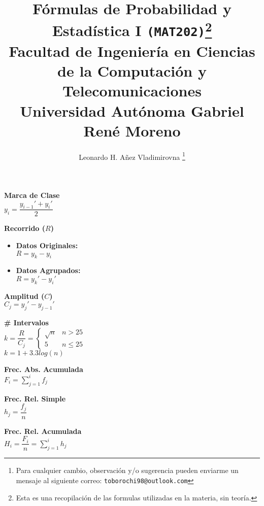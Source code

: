 \documentclass[10pt,letterpaper]{article}
\author{Leonardo H. Añez Vladimirovna \footnote{Para cualquier cambio, observación y/o sugerencia pueden enviarme un mensaje al siguiente correo: \texttt{toborochi98@outlook.com}}}
\title{Fórmulas de Probabilidad y Estadística I \texttt{(MAT202)}\footnote{Esta es una recopilación de las formulas utilizadas en la materia, sin teoría.}\\{\normalsize Facultad de Ingeniería en Ciencias de la Computación y Telecomunicaciones}\\ \vspace{-0.025cm}\normalsize Universidad Autónoma Gabriel René Moreno}
\begin{document}
\maketitle
\begin{multicols}{4}
\begin{flushleft}
\textbf{Marca de Clase}\\
\vspace{0.25cm}
\noindent $y_i=\dfrac{y_{i-1}'+y_i'}{2}$
\end{flushleft}
\columnbreak
\begin{flushleft}
\textbf{Recorrido ($R$)}\\
\begin{itemize}
\item \textbf{Datos Originales:}\\ $R=y_k -y_i$
\item \textbf{Datos Agrupados:}\\ $R=y_k' -y_i'$
\end{itemize}
\end{flushleft}
\columnbreak
\begin{flushleft}
\textbf{Amplitud ($C$)}\\
\vspace{0.25cm}
$C_j=y_j'-y_{j-1}'$


\end{flushleft}
\columnbreak
\begin{flushleft}
\textbf{\# Intervalos}\\
\vspace{0.25cm}
$k=\dfrac{R}{C_j} = \begin{cases} \sqrt{n} & n> 25 \\ 5 & n\leq 25 \end{cases}$\\

\vspace{0.4cm}
$k=1+3.3log(n)$
\end{flushleft}
\end{multicols}

\begin{multicols}{3}
\begin{flushleft}
\textbf{Frec. Abs. Acumulada}\\
\vspace{0.25cm}
$F_i=\displaystyle\sum_{j=1}^{i}f_j$
\end{flushleft}
\columnbreak
\begin{flushleft}
\textbf{Frec. Rel. Simple}\\
\vspace{0.25cm}
$h_j=\dfrac{f_j}{n}$
\end{flushleft}
\columnbreak
\begin{flushleft}
\textbf{Frec. Rel. Acumulada}\\
\vspace{0.25cm}
$H_i=\dfrac{F_i}{n}=\displaystyle\sum_{j=1}^{i}h_j$
\end{flushleft}
\end{multicols}
\end{document}
